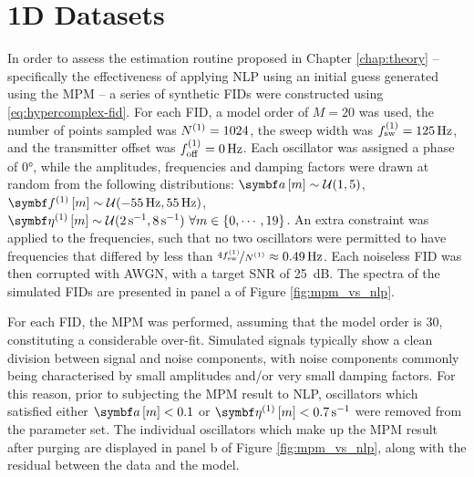 \section{\acs{1D} Datasets}
\label{sec:onedim}

In order to assess the estimation routine proposed in Chapter \ref{chap:theory}
-- specifically the effectiveness of applying \ac{NLP} using an initial guess
generated using the \ac{MPM} -- a series of synthetic \acp{FID} were constructed
using \eqref{eq:hypercomplex-fid}. For each \ac{FID}, a model order of $M=20$
was used, the number of points sampled was $N^{(1)} = 1024$, the sweep width
was $f_{\mathrm{sw}}^{(1)}=\qty{125}{\hertz}$, and the transmitter offset was $f_{\mathrm{off}}^{(1)} =
\qty{0}{\hertz}$.  Each oscillator was assigned a phase of \ang{0}, while the
amplitudes, frequencies and damping factors were drawn at random from the
following distributions:
$\bdam \sim \mathcal{U}(1, 5)$, $\bdfonem \sim \mathcal{U}(\qty{-55}{\hertz},
\qty{55}{\hertz})$, $\bdetaonem \sim \mathcal{U}(\qty{2}{\per\second},
\qty{8}{\per\second})\ \forall m \in \lbrace 0, \cdots, 19\rbrace$. An extra
constraint was applied to the frequencies,
such that no two oscillators were permitted to have frequencies that differed
by less than $\nicefrac{4 f_{\mathrm{sw}}^{(1)}}{N^{(1)}} \approx \qty{0.49}{\hertz}$. Each
noiseless \ac{FID} was then corrupted with \ac{AWGN}, with a target \ac{SNR} of
\qty{25}{\deci\bel}. The spectra of the simulated
\acp{FID} are presented in panel a of Figure \ref{fig:mpm_vs_nlp}.

For each \ac{FID}, the \ac{MPM} was performed, assuming that the model order is
30, constituting a considerable over-fit. Simulated signals typically show a
clean division between signal and noise components, with noise components
commonly being characterised by small amplitudes and/or very small damping
factors. For this reason, prior to subjecting the \ac{MPM} result to \ac{NLP},
oscillators which satisfied either $\bdam < 0.1$ or  $\bdetaonem <
\qty{0.7}{\per\second}$ were removed from the parameter set. The individual
oscillators which make up the \ac{MPM} result after purging are displayed in panel b of
Figure \ref{fig:mpm_vs_nlp}, along with the residual between the data and the
model.

